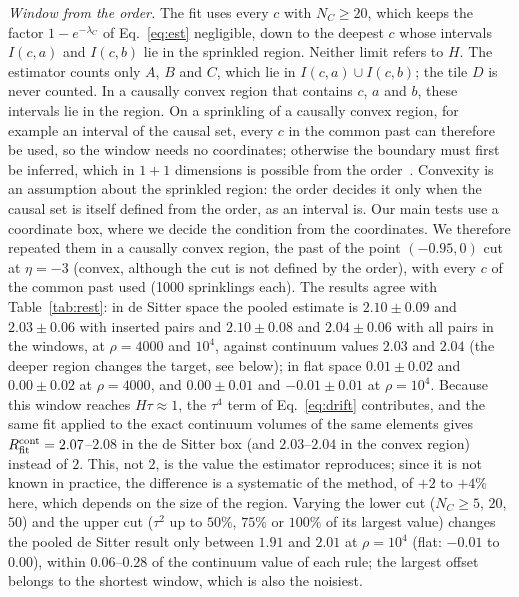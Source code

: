 \documentclass[prd,twocolumn,superscriptaddress,nofootinbib,amsmath,amssymb,floatfix]{revtex4-2}
\begin{document}
\emph{Window from the order.} The fit uses every $c$ with $N_C\geq20$, which keeps the factor $1-e^{-\lambda_C}$ of Eq.~\eqref{eq:est} negligible, down to the deepest $c$ whose intervals $I(c,a)$ and $I(c,b)$ lie in the sprinkled region. Neither limit refers to $H$. The estimator counts only $A$, $B$ and $C$, which lie in $I(c,a)\cup I(c,b)$; the tile $D$ is never counted. In a causally convex region that contains $c$, $a$ and $b$, these intervals lie in the region. On a sprinkling of a causally convex region, for example an interval of the causal set, every $c$ in the common past can therefore be used, so the window needs no coordinates; otherwise the boundary must first be inferred, which in $1+1$ dimensions is possible from the order~\cite{Cunningham18}. Convexity is an assumption about the sprinkled region: the order decides it only when the causal set is itself defined from the order, as an interval is. Our main tests use a coordinate box, where we decide the condition from the coordinates. We therefore repeated them in a causally convex region, the past of the point $(-0.95,0)$ cut at $\eta=-3$ (convex, although the cut is not defined by the order), with every $c$ of the common past used (1000 sprinklings each). The results agree with Table~\ref{tab:rest}: in de Sitter space the pooled estimate is $2.10\pm0.09$ and $2.03\pm0.06$ with inserted pairs and $2.10\pm0.08$ and $2.04\pm0.06$ with all pairs in the windows, at $\rho=4000$ and $10^4$, against continuum values $2.03$ and $2.04$ (the deeper region changes the target, see below); in flat space $0.01\pm0.02$ and $0.00\pm0.02$ at $\rho=4000$, and $0.00\pm0.01$ and $-0.01\pm0.01$ at $\rho=10^4$. Because this window reaches $H\tau\approx1$, the $\tau^4$ term of Eq.~\eqref{eq:drift} contributes, and the same fit applied to the exact continuum volumes of the same elements gives $R_{\rm fit}^{\rm cont}=2.07$--$2.08$ in the de Sitter box (and $2.03$--$2.04$ in the convex region) instead of $2$. This, not $2$, is the value the estimator reproduces; since it is not known in practice, the difference is a systematic of the method, of $+2$ to $+4\%$ here, which depends on the size of the region. Varying the lower cut ($N_C\geq5$, $20$, $50$) and the upper cut ($\tau^2$ up to $50\%$, $75\%$ or $100\%$ of its largest value) changes the pooled de Sitter result only between $1.91$ and $2.01$ at $\rho=10^4$ (flat: $-0.01$ to $0.00$), within $0.06$--$0.28$ of the continuum value of each rule; the largest offset belongs to the shortest window, which is also the noisiest.
\end{document}

